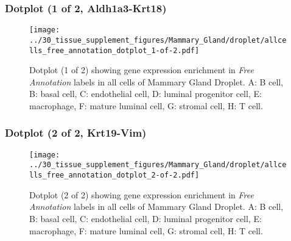 \clearpage

\subsubsection{Dotplot (1 of 2, Aldh1a3-Krt18)}
\begin{figure}[h]
\centering
\texttt{[image: ../30\_tissue\_supplement\_figures/Mammary\_Gland/droplet/allcells\_free\_annotation\_dotplot\_1-of-2.pdf]}

\caption{ Dotplot (1 of 2)  showing gene expression enrichment in \emph{Free Annotation} labels in all cells of Mammary Gland Droplet. A: B cell, B: basal cell, C: endothelial cell, D: luminal progenitor cell, E: macrophage, F: mature luminal cell, G: stromal cell, H: T cell.}
\end{figure}


\clearpage

\subsubsection{Dotplot (2 of 2, Krt19-Vim)}
\begin{figure}[h]
\centering
\texttt{[image: ../30\_tissue\_supplement\_figures/Mammary\_Gland/droplet/allcells\_free\_annotation\_dotplot\_2-of-2.pdf]}

\caption{ Dotplot (2 of 2)  showing gene expression enrichment in \emph{Free Annotation} labels in all cells of Mammary Gland Droplet. A: B cell, B: basal cell, C: endothelial cell, D: luminal progenitor cell, E: macrophage, F: mature luminal cell, G: stromal cell, H: T cell.}
\end{figure}

